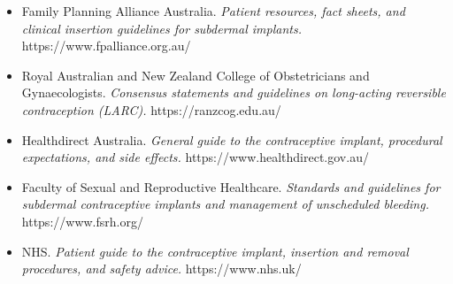 \begin{itemize}
    \item Family Planning Alliance Australia. \textit{Patient resources, fact sheets, and clinical insertion guidelines for subdermal implants.} https://www.fpalliance.org.au/
    \item Royal Australian and New Zealand College of Obstetricians and Gynaecologists. \textit{Consensus statements and guidelines on long-acting reversible contraception (LARC).} https://ranzcog.edu.au/
    \item Healthdirect Australia. \textit{General guide to the contraceptive implant, procedural expectations, and side effects.} https://www.healthdirect.gov.au/
    \item Faculty of Sexual and Reproductive Healthcare. \textit{Standards and guidelines for subdermal contraceptive implants and management of unscheduled bleeding.} https://www.fsrh.org/
    \item NHS. \textit{Patient guide to the contraceptive implant, insertion and removal procedures, and safety advice.} https://www.nhs.uk/
\end{itemize}
